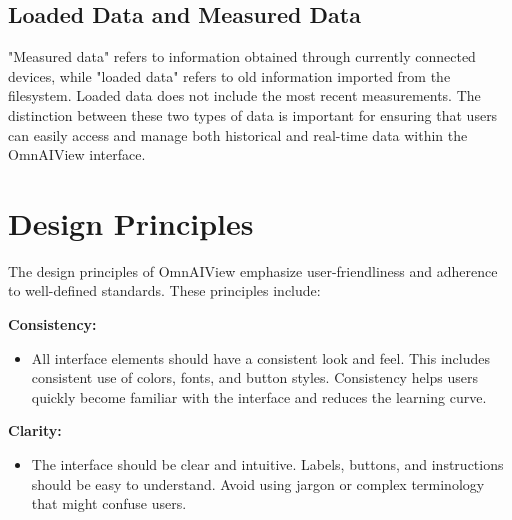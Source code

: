 \documentclass[]{scrreprt}
\begin{document}
\subsection{Loaded Data and Measured Data} \label{cap:loadedData}

"Measured data" refers to information obtained through currently connected devices, while "loaded data" refers to old information imported from the filesystem. Loaded data does not include the most recent measurements. The distinction between these two types of data is important for ensuring that users can easily access and manage both historical and real-time data within the OmnAIView interface.

\section{Design Principles} \label{cap:Designprinciples}

The design principles of OmnAIView emphasize user-friendliness and adherence to well-defined standards. These principles include:

\textbf{Consistency:}
\begin{itemize}
    \item All interface elements should have a consistent look and feel. This includes consistent use of colors, fonts, and button styles. Consistency helps users quickly become familiar with the interface and reduces the learning curve.
\end{itemize}

\textbf{Clarity:}
\begin{itemize}
    \item The interface should be clear and intuitive. Labels, buttons, and instructions should be easy to understand. Avoid using jargon or complex terminology that might confuse users.
\end{itemize}
\end{document}
